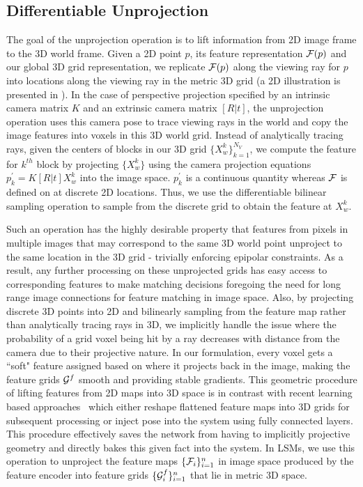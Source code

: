\documentclass[../thesis.tex]{subfiles}
\begin{document}
\subsection{Differentiable Unprojection}
The goal of the unprojection operation is to lift information from 2D image frame to the  3D world frame. Given a 2D point $p$, its feature representation $\mathcal{F}(p)$ and our global 3D grid representation, we replicate $\mathcal{F}(p)$ along the viewing ray for $p$ into locations along the viewing ray in the metric 3D grid (a 2D illustration is presented in ). In the case of perspective projection specified by an intrinsic camera matrix $K$ and an extrinsic camera matrix $[R|t]$, the unprojection operation uses this camera pose to trace viewing rays in the world and copy the image features into voxels in this 3D world grid. Instead of analytically tracing rays, given the centers of blocks in our 3D grid $\{X_w^k\}_{k=1}^{N_V}$, we compute the feature for $k^{th}$ block by projecting $\{X_w^k\}$ using the camera projection equations $p_k^\prime=K[R|t]X_{w}^k$ into the image space. $p_k^\prime$ is a continuous quantity whereas $\mathcal{F}$ is defined on at discrete 2D locations. Thus, we use the differentiable bilinear sampling operation to sample from the discrete grid \cite{spatialtrans_nips2015} to obtain the feature at $X_{w}^k$. 

Such an operation has the highly desirable property that features from pixels in multiple images that may correspond to the same 3D world point unproject to the same location in the 3D grid - trivially enforcing epipolar constraints. As a result, any further processing on these unprojected grids has easy access to corresponding features to make matching decisions foregoing the need for long range image connections for feature matching in image space. Also, by projecting discrete 3D points into 2D and bilinearly sampling from the feature map rather than analytically tracing rays in 3D, we implicitly handle the issue where the probability of a grid voxel being hit by a ray decreases with distance from the camera due to their projective nature. In our formulation, every voxel gets a ``soft" feature assigned based on where it projects back in the image, making the feature grids $\mathcal{G}^f$ smooth and providing stable gradients. This geometric procedure of lifting features from 2D maps into 3D space is in contrast with recent learning based approaches~\cite{choy20163d,tatarchenko2016multi} which either reshape flattened feature maps into 3D grids for subsequent processing or inject pose into the system using fully connected layers. This procedure effectively saves the network from having to implicitly  projective geometry and directly bakes this given fact into the system. In LSMs, we use this operation to unproject the feature maps $\{\mathcal{F}_i\}_{i=1}^n$ in image space produced by the feature encoder into feature grids $\{\mathcal{G}^f_i\}_{i=1}^n$ that lie in metric 3D space.
\end{document}
